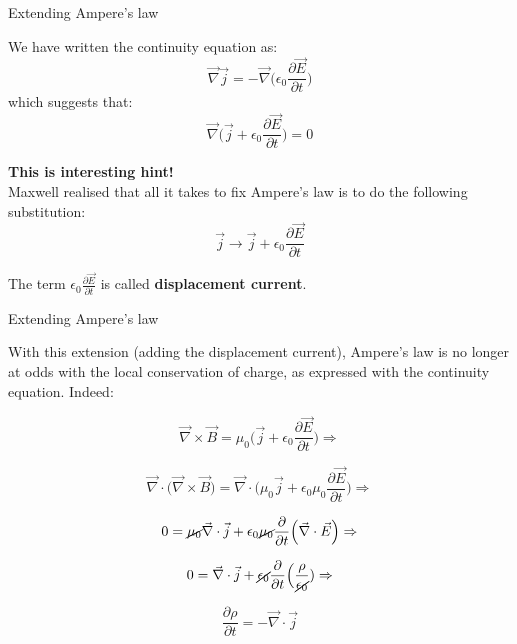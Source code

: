 %
%
%

\begin{frame}{Extending Ampere's law}

We have written the continuity equation as:
\begin{equation*}
  \vec{\nabla} \vec{j} = - \vec{\nabla} \Big( \epsilon_0 \frac{\partial \vec{E}}{\partial t} \Big)
\end{equation*}
which suggests that:
\begin{equation*}
  \vec{\nabla} \Big( \vec{j} + \epsilon_0 \frac{\partial \vec{E}}{\partial t} \Big) = 0
\end{equation*}

{\bf This is interesting hint!}\\
Maxwell realised that all it takes to fix Ampere's law is to do the following substitution:
\begin{equation*}
  \vec{j} \rightarrow
  \vec{j} + \epsilon_0 \frac{\partial \vec{E}}{\partial t}
\end{equation*}

The term $\displaystyle \epsilon_0 \frac{\partial \vec{E}}{\partial t}$ is called {\bf displacement current}.
\end{frame}

%
%
%

\begin{frame}{Extending Ampere's law}

With this extension (adding the displacement current), Ampere's law is no longer at odds with the
local conservation of charge, as expressed with the continuity equation. Indeed:

\begin{equation*}
  \vec{\nabla} \times \vec{B} =
      \mu_0 \Big( \vec{j} + \epsilon_0 \frac{\partial \vec{E}}{\partial t} \Big)  \Rightarrow
\end{equation*}

\begin{equation*}
  \vec{\nabla} \cdot \Big( \vec{\nabla} \times \vec{B} \Big) =
    \vec{\nabla} \cdot \Big( \mu_0 \vec{j} + \epsilon_0 \mu_0 \frac{\partial \vec{E}}{\partial t} \Big)  \Rightarrow
\end{equation*}

\begin{equation*}
  0 =
    \cancel{\mu_0} \vec{\nabla} \cdot \vec{j} + \epsilon_0 \cancel{\mu_0} \frac{\partial}{\partial t}
    \Big( \vec{\nabla} \cdot  \vec{E}\Big)  \Rightarrow
\end{equation*}

\begin{equation*}
  0 =
    \vec{\nabla} \cdot \vec{j} + \cancel{\epsilon_0} \frac{\partial}{\partial t}
      \Big( \frac{\rho}{\cancel{\epsilon_0}})  \Rightarrow
\end{equation*}

\begin{equation*}
    \frac{\partial \rho}{\partial t} = - \vec{\nabla} \cdot \vec{j}
\end{equation*}

\end{frame}


